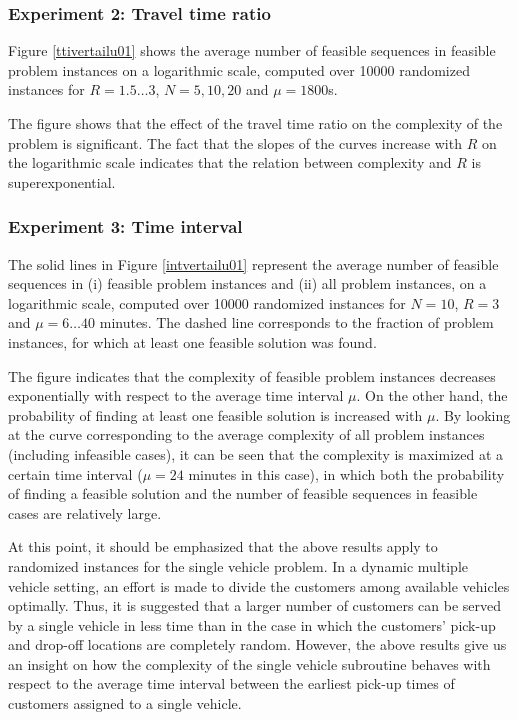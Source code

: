 \documentclass[dissertation,draft*]{aaltoseries}
\begin{document}
\subsubsection{Experiment 2: Travel time ratio}
Figure \ref{ttivertailu01} shows the average number of feasible sequences in feasible problem instances 
on a logarithmic scale, computed over 10000
randomized instances for $R=1.5\ldots 3$, $N = 5,10,20$ and $\mu = 1800$s. 


The figure shows that the effect of the travel time ratio on the complexity of the problem is significant.
The fact that the slopes of the curves increase with $R$ on the logarithmic scale indicates that the relation 
between complexity and $R$ is superexponential.


\subsubsection{Experiment 3: Time interval}
The solid lines in Figure \ref{intvertailu01} represent the average number of feasible sequences in
(i) feasible problem instances and (ii) all problem instances, on a logarithmic scale, computed over 10000
randomized instances for $N=10$, $R=3$ and $\mu = 6 \ldots 40$ minutes. The dashed line corresponds to the fraction
of problem instances, for which at least one feasible solution was found.

The figure indicates that the complexity of feasible problem instances decreases exponentially 
with respect to the average time interval $\mu$. On the other hand, the probability of finding
at least one feasible solution is increased with $\mu$. By looking at the curve corresponding 
to the average complexity of all problem instances (including infeasible cases), it can be seen that the
complexity is maximized at a certain time interval ($\mu = 24$ minutes in this case), in which both the probability of
finding a feasible solution and the number of feasible sequences in feasible cases are relatively large.

At this point, it should be emphasized that the above results apply to randomized instances for the 
single vehicle problem. In a dynamic multiple vehicle setting, an effort is made to 
divide the customers among available vehicles optimally. Thus, it is suggested that a larger number of customers
can be served by a single vehicle in less time than in the case in which the customers' pick-up
and drop-off locations are completely random. However, the above results give us an insight on
how the complexity of the single vehicle subroutine behaves with respect to the average time interval between
the earliest pick-up times of customers assigned to a single vehicle.
\end{document}
